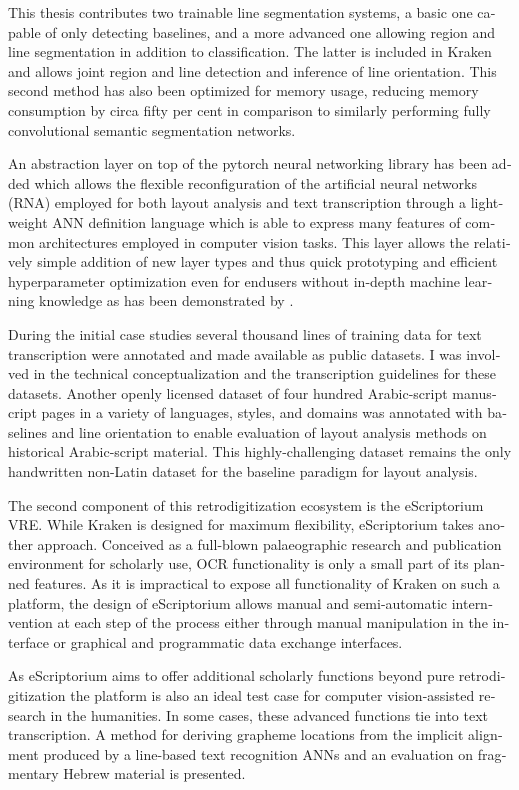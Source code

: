 \begin{french}
This thesis contributes two trainable line segmentation systems, a basic
one capable of only detecting baselines, and a more advanced one allowing
region and line segmentation in addition to classification. The latter is
included in Kraken and allows joint region and line detection and inference of
line orientation. This second method has also been optimized for memory usage,
reducing memory consumption by circa fifty per cent in comparison to similarly
performing fully convolutional semantic segmentation networks.

An abstraction layer on top of the pytorch neural networking library has been
added which allows the flexible reconfiguration of the artificial neural
networks (RNA) employed for both layout analysis and text transcription through
a lightweight ANN definition language which is able to express many features of
common architectures employed in computer vision tasks. This layer allows the
relatively simple addition of new layer types and thus quick prototyping and
efficient hyperparameter optimization even for endusers without in-depth
machine learning knowledge as has been demonstrated by \cite{strobel2020much}. 

During the initial case studies several thousand lines of training data for
text transcription were annotated and made available as public datasets. I was
involved in the technical conceptualization and the transcription guidelines
for these datasets. Another openly licensed dataset of four hundred
Arabic-script manuscript pages in a variety of languages, styles, and domains
was annotated with baselines and line orientation to enable evaluation of
layout analysis methods on historical Arabic-script material.  This
highly-challenging dataset remains the only handwritten non-Latin dataset for
the baseline paradigm for layout analysis.

The second component of this retrodigitization ecosystem is the eScriptorium
VRE.  While Kraken is designed for maximum flexibility, eScriptorium takes
another approach. Conceived as a full-blown palaeographic research and
publication environment for scholarly use, OCR functionality is only a small
part of its planned features. As it is impractical to expose all functionality
of Kraken on such a platform, the design of eScriptorium allows manual and
semi-automatic internvention at each step of the process either through manual
manipulation in the interface or graphical and programmatic data exchange
interfaces.

As eScriptorium aims to offer additional scholarly functions beyond pure
retrodigitization the platform is also an ideal test case for computer
vision-assisted research in the humanities. In some cases, these advanced
functions tie into text transcription. A method for deriving grapheme locations
from the implicit alignment produced by a line-based text recognition ANNs and
an evaluation on fragmentary Hebrew material is presented. 


\end{french}
